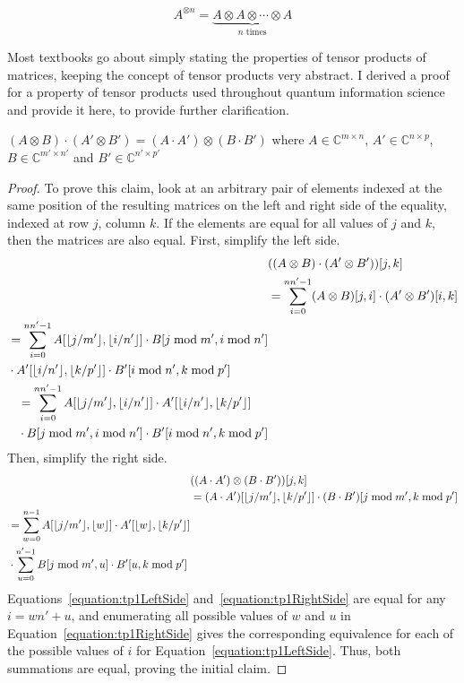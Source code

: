 $$A^{\otimes n} = \underbrace{A \otimes A \otimes \cdots \otimes A}_{n \text{ times}}$$

Most textbooks go about simply stating the properties of tensor products of matrices, keeping the concept of tensor products very abstract. I derived a proof for a property of tensor products used throughout quantum information science and provide it here, to provide further clarification.
\begin{theorem}
\label{theorem:tensorProducts1}
$(A \otimes B) \cdot (A' \otimes B') = (A \cdot A')\otimes(B \cdot B')$ where $A \in \mathbb{C}^{m \times n}$, $A' \in \mathbb{C}^{n \times p}$, $B \in \mathbb{C}^{m' \times n'}$ and $B' \in \mathbb{C}^{n' \times p'}$
\end{theorem}
\begin{proof}
To prove this claim, look at an arbitrary pair of elements indexed at the same position of the resulting matrices on the left and right side of the equality, indexed at row $j$, column $k$. If the elements are equal for all values of $j$ and $k$, then the matrices are also equal. First, simplify the left side.
\begin{align}
& ((A \otimes B)\cdot(A' \otimes B'))[j,k] \\
&= \sum_{i=0}^{nn'-1} (A \otimes B)[j,i]\cdot(A' \otimes B')[i,k] \\
\begin{split}
&= \sum_{i=0}^{nn'-1} A[\lfloor j/m'\rfloor,\lfloor i/n'\rfloor] \cdot B[j \bmod m', i \bmod n'] \\ 
&\cdot A'[\lfloor i/n'\rfloor,\lfloor k/p'\rfloor] \cdot B'[i \bmod n', k \bmod p'] \\
\end{split}\\
\begin{split}
&= \sum_{i=0}^{nn'-1} A[\lfloor j/m'\rfloor,\lfloor i/n'\rfloor] \cdot A'[\lfloor i/n'\rfloor,\lfloor k/p'\rfloor] \\ 
&\cdot B[j \bmod m', i \bmod n'] \cdot B'[i \bmod n', k \bmod p'] \\
\end{split} \label{equation:tp1LeftSide}
\end{align}
Then, simplify the right side.
\begin{align}
& ((A \cdot A')\otimes(B \cdot B'))[j,k] \\
&= (A \cdot A')[\lfloor j / m'\rfloor,\lfloor k / p'\rfloor] \cdot (B \cdot B')[j \bmod m',k \bmod p'] \\
\begin{split}
&=\sum_{w=0}^{n-1} A[\lfloor j/m'\rfloor,\lfloor w\rfloor] \cdot A'[\lfloor w\rfloor,\lfloor k / p'\rfloor]\\
&\cdot \sum_{u=0}^{n'-1}  B[j \bmod m',u] \cdot B'[u,k \bmod p'] \\ \label{equation:tp1RightSide}
\end{split}
\end{align}
Equations~\eqref{equation:tp1LeftSide} and~\eqref{equation:tp1RightSide} are equal for any $i = wn'+u$, and enumerating all possible values of $w$ and $u$ in Equation~\eqref{equation:tp1RightSide} gives the corresponding equivalence for each of the possible values of $i$ for Equation~\eqref{equation:tp1LeftSide}. Thus, both summations are equal, proving the initial claim.
\end{proof}

